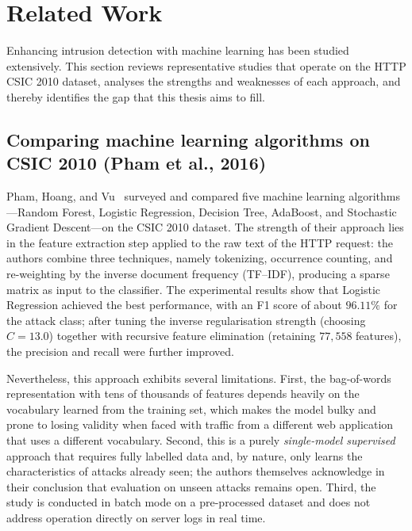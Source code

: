 \documentclass[../main.tex]{subfiles}
\begin{document}
\section{Related Work}
\label{sec:related}

Enhancing intrusion detection with machine learning has been studied
extensively. This section reviews representative studies that operate on
the HTTP CSIC 2010 dataset, analyses the strengths and weaknesses of each
approach, and thereby identifies the gap that this thesis aims to fill.

\subsection{Comparing machine learning algorithms on CSIC 2010
(Pham et al., 2016)}

Pham, Hoang, and Vu~\cite{pham2016} surveyed and compared five machine
learning algorithms---Random Forest, Logistic Regression, Decision Tree,
AdaBoost, and Stochastic Gradient Descent---on the CSIC 2010 dataset. The
strength of their approach lies in the feature extraction step applied to
the raw text of the HTTP request: the authors combine three techniques,
namely tokenizing, occurrence counting, and re-weighting by the inverse
document frequency (TF--IDF), producing a sparse matrix as input to the
classifier. The experimental results show that Logistic Regression
achieved the best performance, with an F1 score of about $96.11\%$ for the
attack class; after tuning the inverse regularisation strength (choosing
$C = 13.0$) together with recursive feature elimination (retaining
$77{,}558$ features), the precision and recall were further improved.

Nevertheless, this approach exhibits several limitations. First, the
bag-of-words representation with tens of thousands of features depends
heavily on the vocabulary learned from the training set, which makes the
model bulky and prone to losing validity when faced with traffic from a
different web application that uses a different vocabulary. Second, this is
a purely \emph{single-model supervised} approach that requires fully
labelled data and, by nature, only learns the characteristics of attacks
already seen; the authors themselves acknowledge in their conclusion that
evaluation on unseen attacks remains open. Third, the study is conducted
in batch mode on a pre-processed dataset and does not address operation
directly on server logs in real time.
\end{document}
